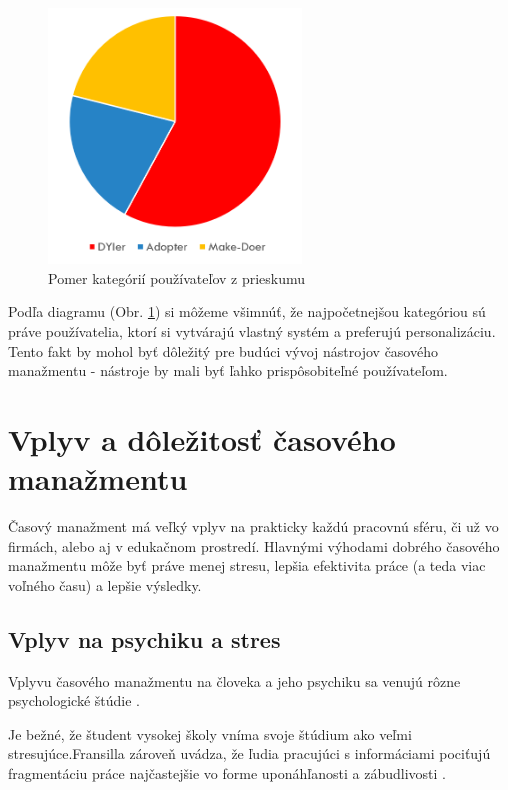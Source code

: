 \documentclass[10pt,slovak,a4paper]{article}
\begin{document}
		\paragraph{}
		\begin{figure}[tbh]
			\centering
			\includegraphics[width=0.6\textwidth]{grafkateg.png}
		\caption{Pomer kategórií používateľov z prieskumu \cite{Haraty}}
		\label{f:kategraf}
		\end{figure}
		
		Podľa diagramu (Obr. \ref{f:kategraf}) si môžeme všimnúť, že najpočetnejšou kategóriou sú práve používatelia, ktorí si vytvárajú vlastný systém a preferujú personalizáciu. Tento fakt by mohol byť dôležitý pre budúci vývoj nástrojov časového manažmentu - nástroje by mali byť ľahko prispôsobiteľné používateľom.
		
\section{Vplyv a dôležitosť časového manažmentu} \label{vplyv_tm}

		Časový manažment má veľký vplyv na prakticky každú pracovnú sféru, či už vo firmách, alebo aj v edukačnom prostredí. Hlavnými výhodami dobrého časového manažmentu môže byť práve menej stresu, lepšia efektivita práce (a teda viac voľného času) a lepšie výsledky.
		
	\subsection{Vplyv na psychiku a stres}
	
		Vplyvu časového manažmentu na človeka a jeho psychiku sa venujú rôzne psychologické štúdie \cite{Macan}.
	
		Je bežné, že študent vysokej školy vníma svoje štúdium ako veľmi stresujúce.Fransilla zároveň uvádza, že ľudia pracujúci s informáciami pociťujú fragmentáciu práce najčastejšie vo forme uponáhľanosti a zábudlivosti \cite{Franssila}.
		
\end{document}
